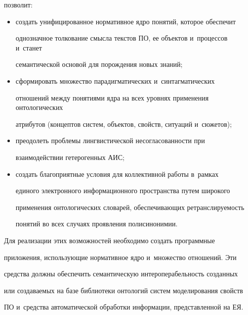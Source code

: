 позволит:


  \begin{itemize}


\item  создать унифицированное нормативное ядро понятий, которое обеспечит 


однозначное толкование смысла текстов ПО, ее объектов и~процессов и~станет 


семантической основой для порождения новых знаний;


  \item сформировать множество парадигматических и~синтагматических 


отношений между понятиями ядра на всех уровнях применения онтологических 


атрибутов (концептов систем, объектов, свойств, ситуаций и~сюжетов);


  \item преодолеть проблемы лингвистической несогласованности при 


взаимодействии гетерогенных АИС;


  \item создать благоприятные условия для коллективной работы в~рамках 


единого электронного информационного пространства путем широкого 


применения онтологических словарей, обеспечивающих ретранслируемость 


понятий во всех случаях проявления полисинонимии. 


  \end{itemize}


  


  Для реализации этих возможностей необходимо создать программные 


приложения, использующие нормативное ядро и~множество отношений. Эти 


средства должны обеспечить семантическую интероперабельность созданных 


или создаваемых на базе библиотеки онтологий систем моделирования свойств 


ПО и~средства автоматической обработки информации, представленной на ЕЯ.


  





